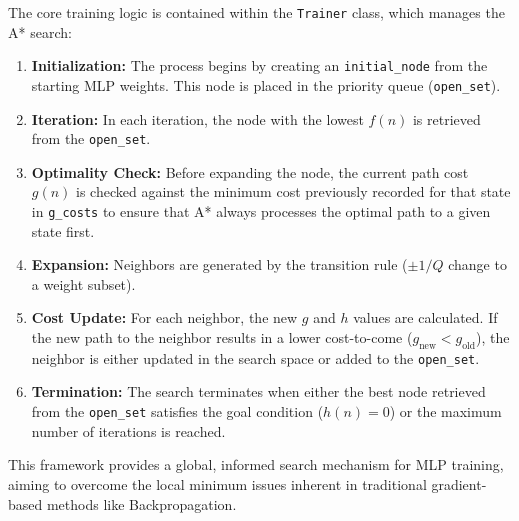 The core training logic is contained within the \texttt{Trainer} class, which manages the A* search:
\begin{enumerate}
    \item \textbf{Initialization:} The process begins by creating an \texttt{initial\_node} from the starting MLP weights. This node is placed in the priority queue (\texttt{open\_set}).
    \item \textbf{Iteration:} In each iteration, the node with the lowest $f(n)$ is retrieved from the \texttt{open\_set}.
    \item \textbf{Optimality Check:} Before expanding the node, the current path cost $g(n)$ is checked against the minimum cost previously recorded for that state in \texttt{g\_costs} to ensure that A* always processes the optimal path to a given state first.
    \item \textbf{Expansion:} Neighbors are generated by the transition rule ($\pm 1/Q$ change to a weight subset).
    \item \textbf{Cost Update:} For each neighbor, the new $g$ and $h$ values are calculated. If the new path to the neighbor results in a lower cost-to-come ($g_{\text{new}} < g_{\text{old}}$), the neighbor is either updated in the search space or added to the \texttt{open\_set}.
    \item \textbf{Termination:} The search terminates when either the best node retrieved from the \texttt{open\_set} satisfies the goal condition ($h(n) = 0$) or the maximum number of iterations is reached.
\end{enumerate}

This framework provides a global, informed search mechanism for MLP training, aiming to overcome the local minimum issues inherent in traditional gradient-based methods like Backpropagation.
